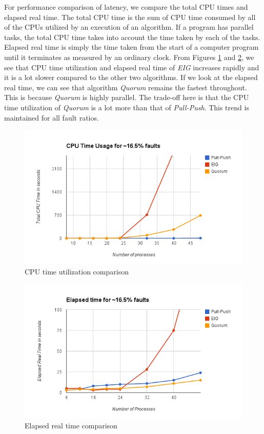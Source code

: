 For performance comparison of latency, we compare the total CPU times and elapsed real time.  The total CPU time is the sum of CPU time consumed by all of the CPUs utilized by an execution of an algorithm. If a program has parallel tasks, the total CPU time takes into account the time taken by each of the tasks. Elapsed real time is simply the time taken from the start of a computer program until it terminates as measured by an ordinary clock. From Figures \ref{fig:cpu} and \ref{fig:elapsed}, we see that CPU time utilization and elapsed real time of \textit{EIG} increases rapidly and it is a lot slower compared to the other two algorithms. If we look at the elapsed real time, we can see that algorithm \textit{Quorum} remains the fastest throughout. This is because \textit{Quorum} is highly parallel. The trade-off here is that the CPU time utilization of \textit{Quorum} is a lot more than that of \textit{Pull-Push}. This trend is maintained for all fault ratios.

\begin{figure}[ht]
 \centering
\includegraphics[scale=0.4]{cpu16}
\caption{CPU time utilization comparison}
 \label{fig:cpu}
\end{figure}

\begin{figure}[ht]
 \centering
\includegraphics[scale=0.4]{elapsed16}
\caption{Elapsed real time comparison}
 \label{fig:elapsed}
\end{figure}

